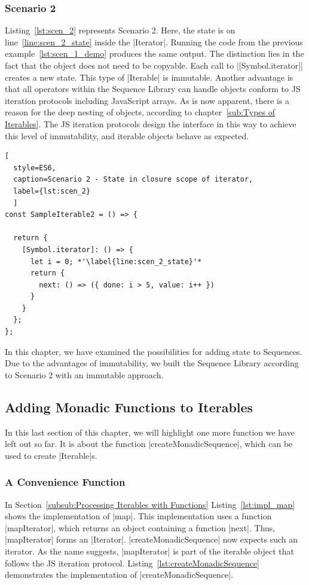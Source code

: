 \subsubsection{Scenario 2}
Listing~\ref{lst:scen_2} represents Scenario 2. Here, the state is on
line~\ref{line:scen_2_state} inside the |Iterator|. Running the code from the previous 
example~\ref{lst:scen_1_demo} produces the same output. The distinction lies in
the fact that the object does not need to be copyable. Each call to |[Symbol.iterator]| 
creates a new state. This type of |Iterable| is immutable. Another advantage is
that all operators within the Sequence Library can handle objects conform to JS
iteration protocols including JavaScript arrays.
\newline
As is now apparent, there is a reason for the deep nesting of objects, according 
to chapter~\ref{sub:Types of Iterables}. The JS iteration protocols design the 
interface in this way to achieve this level of immutability, and iterable 
objects behave as expected.

\begin{lstlisting}[
  style=ES6, 
  caption=Scenario 2 - State in closure scope of iterator,
  label={lst:scen_2}
  ]
const SampleIterable2 = () => {

  return {
    [Symbol.iterator]: () => {
      let i = 0; *'\label{line:scen_2_state}'*
      return {
        next: () => ({ done: i > 5, value: i++ })
      }
    }
  };
};
\end{lstlisting}

In this chapter, we have examined the possibilities for adding state to 
Sequences. Due to the advantages of immutability, we built the Sequence Library 
according to Scenario 2 with an immutable approach.


\subsection{Adding Monadic Functions to Iterables}
\label{sub:Adding Monadic Functions to Iterables}
In this last section of this chapter, we will highlight one more function we 
have left out so far. It is about the function |createMonadicSequence|, which
can be used to create |Iterable|s.

\subsubsection{A Convenience Function}
\label{subsub:A Convenience Function}
In Section~\ref{subsub:Processing Iterables with Functions}
Listing~\ref{lst:impl_map} shows the implementation of |map|. 
This implementation uses a function |mapIterator|, which returns an object
containing a function |next|. Thus, |mapIterator| forms an |Iterator|.
|createMonadicSequence| now expects such an iterator. As the name suggests, 
|mapIterator| is part of the 
iterable object that follows the JS iteration protocol.
Listing~\ref{lst:createMonadicSequence} demonstrates the implementation of 
|createMonadicSequence|.

